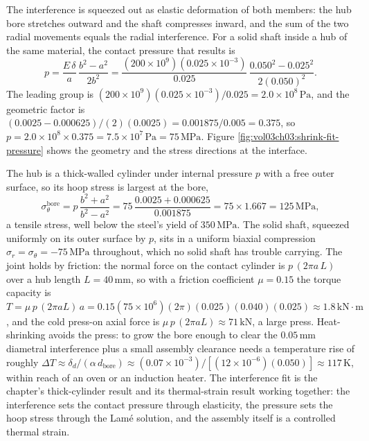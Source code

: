 The interference is squeezed out as elastic deformation of both members:
the hub bore stretches outward and the shaft compresses inward, and the
sum of the two radial movements equals the radial interference. For a
solid shaft inside a hub of the same material, the contact pressure that
results is
\[
p = \frac{E\,\delta}{a}\,\frac{b^2 - a^2}{2 b^2} = \frac{(200\times 10^9)
(0.025\times 10^{-3})}{0.025}\,\frac{0.050^2 - 0.025^2}{2(0.050)^2}.
\]
The leading group is $(200\times 10^9)(0.025\times 10^{-3})/0.025 =
2.0\times 10^8\,\text{Pa}$, and the geometric factor is $(0.0025 -
0.000625)/(2)(0.0025) = 0.001875/0.005 = 0.375$, so $p = 2.0\times 10^8
\times 0.375 = 7.5\times 10^7\,\text{Pa} = 75\,\text{MPa}$. Figure
\ref{fig:vol03ch03:shrink-fit-pressure} shows the geometry and the
stress directions at the interface.



The hub is a thick-walled cylinder under internal pressure $p$ with a
free outer surface, so its hoop stress is largest at the bore,
\[
\sigma_\theta^{\text{bore}} = p\,\frac{b^2 + a^2}{b^2 - a^2} = 75\,
\frac{0.0025 + 0.000625}{0.001875} = 75 \times 1.667 = 125\,\text{MPa},
\]
a tensile stress, well below the steel's yield of $350\,\text{MPa}$. The
solid shaft, squeezed uniformly on its outer surface by $p$, sits in a
uniform biaxial compression $\sigma_r = \sigma_\theta = -75\,\text{MPa}$
throughout, which no solid shaft has trouble carrying. The joint holds by
friction: the normal force on the contact cylinder is $p\,(2\pi a\,L)$
over a hub length $L = 40\,\si{\milli\meter}$, so with a friction
coefficient $\mu = 0.15$ the torque capacity is $T = \mu\,p\,(2\pi a L)\,a
= 0.15(75\times 10^6)(2\pi)(0.025)(0.040)(0.025) \approx 1.8\,\text{kN}
\cdot\text{m}$, and the cold press-on axial force is $\mu\,p\,(2\pi a L)
\approx 71\,\text{kN}$, a large press. Heat-shrinking avoids the press:
to grow the bore enough to clear the $0.05\,\si{\milli\meter}$ diametral
interference plus a small assembly clearance needs a temperature rise of
roughly $\Delta T \approx \delta_d/(\alpha\,d_{\text{bore}}) \approx
(0.07\times 10^{-3})/[(12\times 10^{-6})(0.050)] \approx 117\,\text{K}$,
within reach of an oven or an induction heater. The interference fit is
the chapter's thick-cylinder result and its thermal-strain result
working together: the interference sets the contact pressure through
elasticity, the pressure sets the hoop stress through the Lam\'e
solution, and the assembly itself is a controlled thermal strain.

